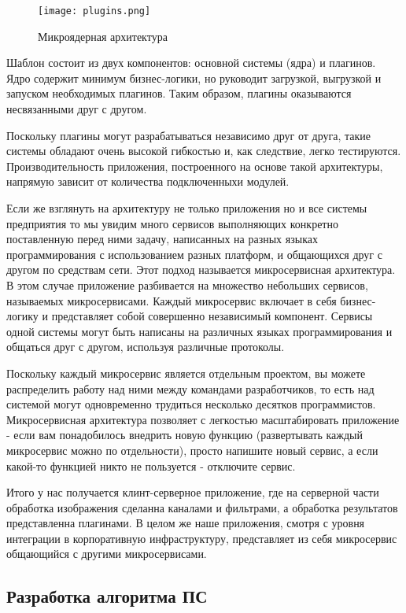 \begin{figure}[ht] 
    \centering
    \texttt{[image: plugins.png]}  
    \caption{Микроядерная архитектура}
    \label{fig:arch_arch:plugins}
\end{figure}

Шаблон состоит из двух компонентов: основной системы (ядра) и плагинов. Ядро содержит минимум бизнес-логики, но руководит загрузкой, выгрузкой и запуском необходимых плагинов. Таким образом, плагины оказываются несвязанными друг с другом.

Поскольку плагины могут разрабатываться независимо друг от друга, такие системы обладают очень высокой гибкостью и, как следствие, легко тестируются. Производительность приложения, построенного на основе такой архитектуры, напрямую зависит от количества подключенныхи модулей.

Если же взглянуть на архитектуру не только приложения но и все системы предприятия то мы увидим много сервисов выполняющих конкретно поставленную перед ними задачу, написанных на разных языках программирования с использованием разных платформ, и общающихся друг с другом по средствам сети. Этот подход называется микросервисная архитектура. В этом случае приложение разбивается на множество небольших сервисов, называемых микросервисами. Каждый микросервис включает в себя бизнес-логику и представляет собой совершенно независимый компонент. Сервисы одной системы могут быть написаны на различных языках программирования и общаться друг с другом, используя различные протоколы.

Поскольку каждый микросервис является отдельным проектом, вы можете распределить работу над ними между командами разработчиков, то есть над системой могут одновременно трудиться несколько десятков программистов. Микросервисная архитектура позволяет с легкостью масштабировать приложение - если вам понадобилось внедрить новую функцию (развертывать каждый микросервис можно по отдельности), просто напишите новый сервис, а если какой-то функцией никто не пользуется - отключите сервис.

Итого у нас получается клинт-серверное приложение, где на серверной части обработка изображения сделанна каналами и фильтрами, а обработка результатов представленна плагинами. В целом же наше приложения, смотря с уровня интеграции в корпоративную инфраструктуру, представляет из себя микросервис общающийся с другими микросервисами.

\subsection{Разработка  алгоритма ПС}
\label{sec:arch:algorythm}

